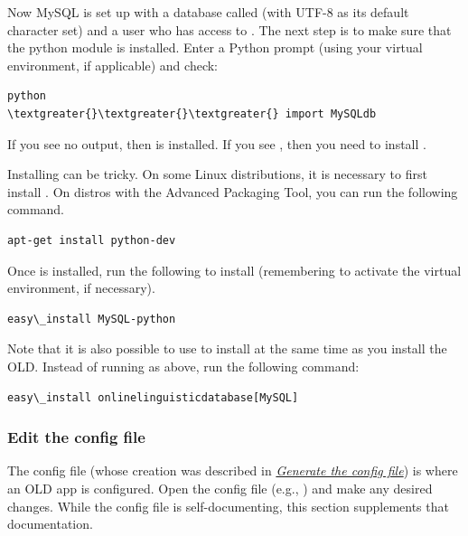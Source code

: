 \documentclass[letterpaper,10pt,english]{sphinxmanual}
\begin{document}
Now MySQL is set up with a database called  (with UTF-8 as its default
character set) and a user  who has access to .  The next
step is to make sure that the python module  is installed.  Enter a
Python prompt (using your virtual environment, if applicable) and check:

\begin{Verbatim}[commandchars=\\\{\}]
python
\textgreater{}\textgreater{}\textgreater{} import MySQLdb
\end{Verbatim}

If you see no output, then  is installed.  If you see , then you need to install .

Installing  can be tricky.  On some Linux distributions, it is
necessary to first install .  On distros with the Advanced
Packaging Tool, you can run the following command.

\begin{Verbatim}[commandchars=\\\{\}]
apt-get install python-dev
\end{Verbatim}

Once  is installed, run the following to install 
(remembering to activate the virtual environment, if necessary).

\begin{Verbatim}[commandchars=\\\{\}]
easy\_install MySQL-python
\end{Verbatim}

Note that it is also possible to use  to install  at
the same time as you install the OLD.  Instead of running  as above, run the following command:

\begin{Verbatim}[commandchars=\\\{\}]
easy\_install onlinelinguisticdatabase[MySQL]
\end{Verbatim}


\subsubsection{Edit the config file}
\label{installation:edit-config}\label{installation:edit-the-config-file}
The config file (whose creation was described in {\hyperref[installation:gen-config]{\emph{Generate the config file}}}) is where an
OLD app is configured.  Open the config file (e.g., ) and make
any desired changes.  While the config file is self-documenting, this section
supplements that documentation.
\end{document}

